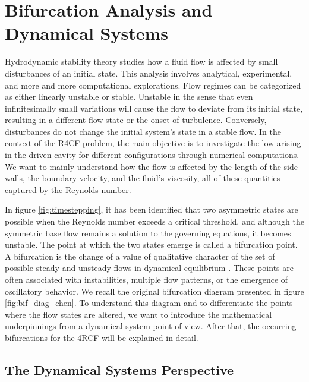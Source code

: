 
\section{Bifurcation Analysis and Dynamical Systems} \label{sec:bif}

Hydrodynamic stability theory studies how a fluid flow is affected by small
disturbances of an initial state. This analysis involves analytical,
experimental, and more and more computational explorations. Flow regimes can be
categorized as either linearly unstable or stable. Unstable in the sense that
even infinitesimally small variations will cause the flow to deviate from its
initial state, resulting in a different flow state or the onset of turbulence.
Conversely, disturbances do not change the initial system's state in a stable
flow. In the context of the R4CF problem, the main objective is to investigate
the low arising in the driven cavity for different configurations through
numerical computations. We want to mainly understand how the flow is affected
by the length of the side walls, the boundary velocity, and the fluid's
viscosity, all of these quantities captured by the Reynolds number.

In figure \ref{fig:timestepping}, it has been identified that two asymmetric
states are possible when the Reynolds number exceeds a critical threshold, and
although the symmetric base flow remains a solution to the governing equations,
it becomes unstable. The point at which the two states emerge is called a
bifurcation point. A bifurcation is the change of a value of qualitative
character of the set of possible steady and unsteady flows in dynamical
equilibrium \citep{drazin2002}. These points are often associated with
instabilities, multiple flow patterns, or the emergence of oscillatory
behavior. We recall the original bifurcation diagram presented in figure
\ref{fig:bif_diag_chen}. To understand this diagram and to differentiate the
points where the flow states are altered, we want to introduce the mathematical
underpinnings from a dynamical system point of view. After that, the occurring
bifurcations for the 4RCF will be explained in detail.

\subsection{The Dynamical Systems Perspective}

